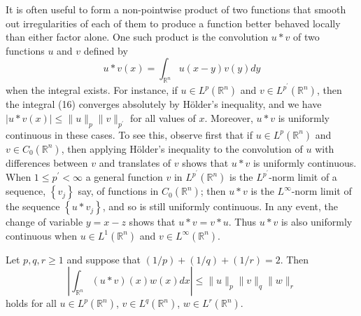 \begin{para}
  It is often useful to form a non-pointwise product of two functions that smooth out irregularities of each of them to produce a function better behaved locally than either factor alone. One such product is the convolution $u * v$ of two functions $u$ and $v$ defined by
  \begin{equation}\label{eq:2.16}
    u * v(x)=\int_{\mathbb{R}^n} u(x-y) v(y) d y
  \end{equation}
  when the integral exists. For instance, if $u \in L^p(\mathbb{R}^n)$ and $v \in L^{p^{\prime}}(\mathbb{R}^n)$, then the integral (16) converges absolutely by Hölder's inequality, and we have $|u * v(x)| \leq\|u\|_p\|v\|_{p^{\prime}}$ for all values of $x$. Moreover, $u * v$ is uniformly continuous in these cases. To see this, observe first that if $u \in L^p(\mathbb{R}^n)$ and $v \in C_0(\mathbb{R}^n)$, then applying Hölder's inequality to the convolution of $u$ with differences between $v$ and translates of $v$ shows that $u * v$ is uniformly continuous. When $1 \leq p^{\prime}<\infty$ a general function $v$ in $L^{p^{\prime}}(\mathbb{R}^n)$ is the $L^{p^{\prime}}$-norm limit of a sequence, $\left\{v_j\right\}$ say, of functions in $C_0(\mathbb{R}^n)$; then $u * v$ is the $L^{\infty}$-norm limit of the sequence $\left\{u * v_j\right\}$, and so is still uniformly continuous. In any event, the change of variable $y=x-z$ shows that $u * v=v * u$. Thus $u * v$ is also uniformly continuous when $u \in L^1(\mathbb{R}^n)$ and $v \in L^{\infty}(\mathbb{R}^n)$.
\end{para}


\begin{theorem}
  Let $p, q, r \geq 1$ and suppose that $(1 / p)+(1 / q)+(1 / r)=2$. Then
  \[
  \left|\int_{\mathbb{R}^n}(u * v)(x) w(x) d x\right| \leq\|u\|_p\|v\|_q\|w\|_r
  \]
  holds for all $u \in L^p(\mathbb{R}^n)$,
  $v \in L^q(\mathbb{R}^n)$, $w \in L^r(\mathbb{R}^n)$.
\end{theorem}

